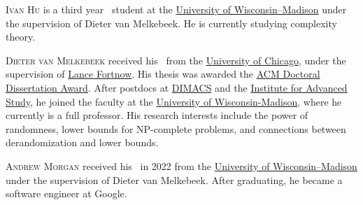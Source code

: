 \documentclass{toc}
\begin{document}
%
%
%
%
%
%
%
%
%
%
%
%
%
%
%
%
%
%
%
%
\begin{tocaboutauthors}
\begin{tocabout}[hu]  %
  \textsc{Ivan Hu} is a third year \phd\ student at the
%
  \href{https://www.wisc.edu/}{University of Wisconsin–Madison}
  under the supervision of Dieter van Melkebeek. 
  He is currently studying complexity theory.
\end{tocabout}
\begin{tocabout}[vanmelkebeek]
\textsc{Dieter van Melkebeek} received his \phd\ from the 
\href{http://www.uchicago.edu}{University of Chicago},
under the supervision of 
\href{http://lance.fortnow.com}{Lance Fortnow}. 
His thesis was awarded the 
\href{https://awards.acm.org/award-recipients/vanmelkebeek_7183705}{ACM 
Doctoral Dissertation Award}. 
After postdocs at 
\href{http://dimacs.rutgers.edu}{DIMACS} and the
\href{http://www.ias.edu}{Institute for Advanced Study},
he joined the faculty at the
\href{http://www.wisc.edu}{University of Wisconsin-Madison}, where he currently is a full professor. His research interests include the power of randomness, lower bounds for NP-complete problems, and connections between derandomization and lower bounds. 
\end{tocabout}
\begin{tocabout}[morgan]
    \textsc{Andrew Morgan} received his \phd\ in 2022 from the 
    \href{https://www.wisc.edu/}{University of Wisconsin–Madison} 
    under the supervision of Dieter van Melkebeek. After
    graduating, he became a software engineer at Google.
\end{tocabout}
\end{tocaboutauthors}
\end{document}
